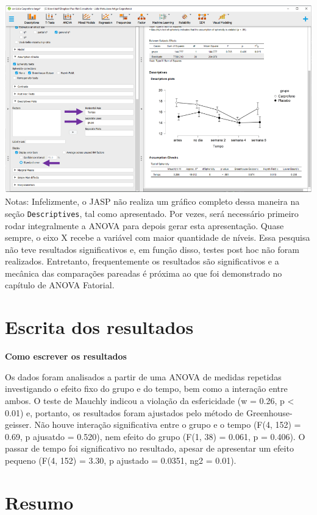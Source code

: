 \documentclass[
]{book}
\begin{document}
\includegraphics{./img/cap_anovarm_grafico.png}
Notas: Infelizmente, o JASP não realiza um gráfico completo dessa maneira na seção \texttt{Descriptives}, tal como apresentado. Por vezes, será necessário primeiro rodar integralmente a ANOVA para depois gerar esta apresentação. Quase sempre, o eixo X recebe a variável com maior quantidade de níveis. Essa pesquisa não teve resultados significativos e, em função disso, testes post hoc não foram realizados. Entretanto, frequentemente os resultados são significativos e a mecânica das comparações pareadas é próxima ao que foi demonstrado no capítulo de ANOVA Fatorial.

\hypertarget{escrita-dos-resultados-9}{%
\section{Escrita dos resultados}\label{escrita-dos-resultados-9}}

\begin{writing}
\textbf{Como escrever os resultados}

Os dados foram analisados a partir de uma ANOVA de medidas repetidas
investigando o efeito fixo do grupo e do tempo, bem como a interação
entre ambos. O teste de Mauchly indicou a violação da esfericidade (w =
0.26, p \textless{} 0.01) e, portanto, os resultados foram ajustados
pelo método de Greenhouse-geisser. Não houve interação significativa
entre o grupo e o tempo (F(4, 152) = 0.69, p ajusatdo = 0.520), nem
efeito do grupo (F(1, 38) = 0.061, p = 0.406). O passar de tempo foi
significativo no resultado, apesar de apresentar um efeito pequeno (F(4,
152) = 3.30, p ajustado = 0.0351, ng2 = 0.01).
\end{writing}

\hypertarget{resumo-9}{%
\section{Resumo}\label{resumo-9}}
\end{document}
